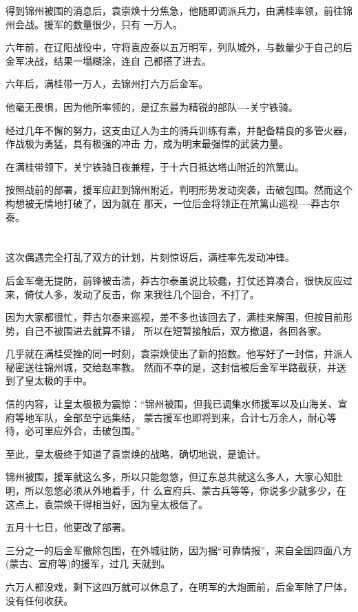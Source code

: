 \documentclass[11pt,a4paper,onecolumn]{article}
\begin{document}
得到锦州被围的消息后，袁崇焕十分焦急，他随即调派兵力，由满桂率领，前往锦州会战。援军的数量很少，只有
一万人。

六年前，在辽阳战役中，守将袁应泰以五万明军，列队城外，与数量少于自己的后金军决战，结果一塌糊涂，连自
己都搭了进去。

六年后，满桂带一万人，去锦州打六万后金军。

他毫无畏惧，因为他所率领的，是辽东最为精锐的部队----关宁铁骑。

经过几年不懈的努力，这支由辽人为主的骑兵训练有素，并配备精良的多管火器，作战极为勇猛，具有极强的冲击
力，成为明末最强悍的武装力量。

在满桂带领下，关宁铁骑日夜兼程，于十六日抵达塔山附近的笊篱山。

按照战前的部署，援军应赶到锦州附近，判明形势发动突袭，击破包围。然而这个构想被无情地打破了，因为就在
那天，一位后金将领正在笊篱山巡视----莽古尔泰。

\section[\thesection]{}

这次偶遇完全打乱了双方的计划，片刻惊讶后，满桂率先发动冲锋。

后金军毫无提防，前锋被击溃，莽古尔泰虽说比较蠢，打仗还算凑合，很快反应过来，倚仗人多，发动了反击，你
来我往几个回合，不打了。

因为大家都很忙，莽古尔泰来巡视，差不多也该回去了，满桂来解围，但按目前形势，自己不被围进去就算不错，
所以在短暂接触后，双方撤退，各回各家。

几乎就在满桂受挫的同一时刻，袁崇焕使出了新的招数。他写好了一封信，并派人秘密送往锦州城，交给赵率教。
然而不幸的是，这封信被后金军半路截获，并送到了皇太极的手中。

信的内容，让皇太极极为震惊：``锦州被围，但我已调集水师援军以及山海关、宣府等地军队，全部至宁远集结，
蒙古援军也即将到来，合计七万余人，耐心等待，必可里应外合，击破包围。''

至此，皇太极终于知道了袁崇焕的战略，确切地说，是诡计。

锦州被围，援军就这么多，所以只能忽悠，但辽东总共就这么多人，大家心知肚明，所以忽悠必须从外地着手，什
么宣府兵、蒙古兵等等，你说多少就多少，在这点上，袁崇焕干得相当好，因为皇太极信了。

五月十七日，他更改了部署。

三分之一的后金军撤除包围，在外城驻防，因为据``可靠情报''，来自全国四面八方(蒙古、宣府等)的援军，过几
天就到。

六万人都没戏，剩下这四万就可以休息了，在明军的大炮面前，后金军除了尸体，没有任何收获。
\end{document}
